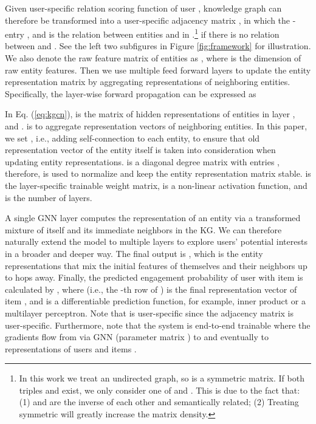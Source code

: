 \documentclass[sigconf]{acmart}
\begin{document}
		Given user-specific relation scoring function  of user , knowledge graph  can therefore be transformed into a user-specific adjacency matrix , in which the -entry , and  is the relation between entities  and  in .\footnote{In this work we treat  an undirected graph, so  is a symmetric matrix. If both triples  and  exist, we only consider one of  and . This is due to the fact that: (1)  and  are the inverse of each other and semantically related; (2) Treating  symmetric will greatly increase the matrix density.}
		 if there is no relation between  and .
		See the left two subfigures in Figure \ref{fig:framework} for illustration.
		We also denote the raw feature matrix of entities as , where  is the dimension of raw entity features.
		Then we use multiple feed forward layers to update the entity representation matrix by aggregating representations of neighboring entities.
		Specifically, the layer-wise forward propagation can be expressed as
		
		In Eq. (\ref{eq:kgcn}),  is the matrix of hidden representations of entities in layer , and .
		 is to aggregate representation vectors of neighboring entities.
		In this paper, we set , i.e., adding self-connection to each entity, to ensure that old representation vector of the entity itself is taken into consideration when updating entity representations.
		 is a diagonal degree matrix with entries , therefore,  is used to normalize  and keep the entity representation matrix  stable.
		  is the layer-specific trainable weight matrix,  is a non-linear activation function, and  is the number of layers.
		 
		A single GNN layer computes the representation of an entity via a transformed mixture of itself and its immediate neighbors in the KG.
		We can therefore naturally extend the model to multiple layers to explore users' potential interests in a broader and deeper way.
		The final output is , which is the entity representations that mix the initial features of themselves and their neighbors up to  hops away.
		Finally, the predicted engagement probability of user  with item  is calculated by , where  (i.e., the -th row of ) is the final representation vector of item , and  is a differentiable prediction function, for example, inner product or a multilayer perceptron.
		Note that  is user-specific since the adjacency matrix  is user-specific.
		Furthermore, note that the system is end-to-end trainable where the gradients flow from  via GNN (parameter matrix ) to  and eventually to representations of users  and items .
	
\end{document}
